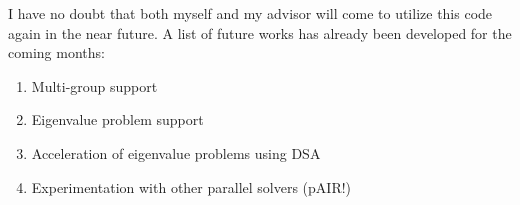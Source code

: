 \documentclass{article}
\begin{document}
I have no doubt that both myself and my advisor will come to utilize this code again in the near future. A list of future works has already been developed for the coming months:
\begin{enumerate}
	\item Multi-group support
	\item Eigenvalue problem support
	\item Acceleration of eigenvalue problems using DSA
	\item Experimentation with other parallel solvers (pAIR!)
\end{enumerate}

\renewcommand\refname{References}

 
\end{document}
